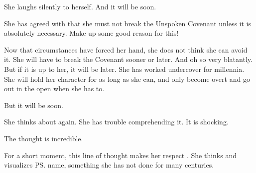 She laughs silently to herself.
And it will be soon. 

She has agreed with \Secherdamon that she must not break the Unspoken Covenant unless it is absolutely necessary. 
Make up some good reason for this!

Now that circumstances have forced her hand, she does not think she can avoid it.
She will have to break the Covenant sooner or later.
And oh so very blatantly. 
But if it is up to her, it will be later. 
She has worked undercover for millennia.
She will hold her character for as long as she can, and only become overt and go out in the open when she has to. 

But it will be soon. 

\begin{comment}
  \subsection{Takestsha thinks about Ishnaruchaefir}
\end{comment}
She thinks about \Ishnaruchaefir again. 
She has trouble comprehending it. 
It is shocking. 

The thought is incredible.


For a short moment, this line of thought makes her respect \Ishnaruchaefir{}. 
She thinks and visualizes \ps{\Ishnaruchaefir} name, something she has not done for many centuries. 









